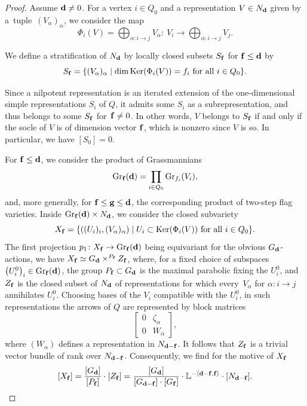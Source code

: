 \documentclass[10pt,a4paper]{amsart}
\numberwithin{equation}{section}
\theoremstyle{definition}
\begin{document}
\begin{proof} Assume ${\bf d}\not=0$. For a vertex $i\in Q_0$ and a representation $V\in N_{\bf d}$ given by a~tuple~$(V_\alpha)_\alpha$, we consider the map
\[\Phi_i(V)=\bigoplus_{\alpha\colon i\rightarrow j}V_\alpha\colon\ V_i\rightarrow\bigoplus_{\alpha\colon i\rightarrow j}V_j.\]

We define a stratification of $N_{\bf d}$ by locally closed subsets $S_{\bf f}$ for ${\bf f}\leq{\bf d}$ by
\[S_{\bf f}=\{(V_\alpha)_\alpha \mid \dim{\rm Ker}(\Phi_i(V))=f_i\mbox{ for all }i\in Q_0\}.\]

Since a nilpotent representation is an iterated extension of the one-dimensional simple representations $S_i$ of $Q$, it admits some $S_i$ as a subrepresentation, and thus belongs to some $S_{\bf f}$ for~${{\bf f}\not={ 0}}$. In other words, $V$ belongs to $S_{\bf f}$ if and only if the socle of $V$ is of dimension vector ${\bf f}$, which is nonzero since $V$ is so. In particular, we have $[S_{ 0}]=0$.

For ${\bf f}\leq{\bf d}$, we consider the product of Grassmannians
\[{\rm Gr}_{\bf f}({\bf d})=\prod_{i\in Q_0}{\rm Gr}_{f_i}(V_i),\]
and, more generally, for ${\bf f}\leq{\bf g}\leq{\bf d}$, the corresponding product  of two-step flag varieties.
Inside ${\rm Gr}_{\bf f}({\bf d})\times N_{\bf d}$, we consider the closed subvariety
\[X_{\bf f}=\{((U_i)_i,(V_\alpha)_\alpha) \mid U_i\subset{\rm Ker}(\Phi_i(V))\mbox{ for all }i\in Q_0\}.\]
The first projection $p_1\colon X_{\bf f}\rightarrow {\rm Gr}_{\bf f}({\bf d})$ being equivariant for the obvious $G_{\bf d}$-actions, we have $X_{\bf f}\simeq G_{\bf d}\times^{P_{\bf f}}Z_{\bf f}$,
where, for a fixed choice of subspaces $\bigl(U_i^0\bigr)_i\in {\rm Gr}_{\bf f}({\bf d})$, the group $P_{\bf f}\subset G_{\bf d}$ is the maximal parabolic fixing the $U_i^0$, and $Z_{\bf f}$ is the closed subset of $N_{\bf d}$ of representations for which every~$V_\alpha$ for $\alpha\colon i\rightarrow j$ annihilates $U_i^0$. Choosing bases of the $V_i$ compatible with the $U_i^0$, in such representations the arrows of $Q$ are represented by block matrices
\[
\left[\begin{matrix}0&\zeta_\alpha\\ 0&W_\alpha\end{matrix}\right],
\]
where $(W_\alpha)$ defines a representation in $N_{{\bf d}-{\bf f}}$. It follows that $Z_{\bf f}$ is a trivial vector bundle of rank  over $N_{{\bf d}-{\bf f}}$. Consequently, we find for the motive of $X_{\bf f}$
\[[X_{\bf f}]=\frac{[G_{\bf d}]}{[P_{\bf f}]}\cdot[Z_{\bf f}]=\frac{[G_{\bf d}]}{[G_{{\bf d}-{\bf f}}]\cdot[G_{\bf f}]}\cdot\mathbb{L}^{-\langle{\bf d}-{\bf f},{\bf f}\rangle}\cdot[N_{{\bf d}-{\bf f}}].\]


\end{proof}
\end{document}
